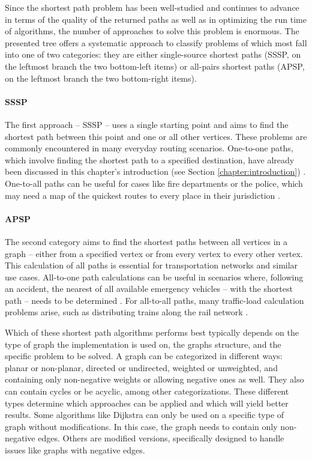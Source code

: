Since the shortest path problem has been well-studied and continues to advance in terms of the quality of the returned paths as well as in optimizing the run time of algorithms, the number of approaches to solve this problem is enormous.
The presented tree offers a systematic approach to classify problems of which most fall into one of two categories: they are either single-source shortest paths (SSSP, on the leftmost branch the two bottom-left items) or all-pairs shortest paths (APSP, on the leftmost branch the two bottom-right items).

\paragraph{SSSP}

The first approach -- SSSP -- uses a single starting point and aims to find the shortest path between this point and one or all other vertices.
These problems are commonly encountered in many everyday routing scenarios. 
One-to-one paths, which involve finding the shortest path to a specified destination, have already been discussed in this chapter's introduction (see Section \ref{chapter:introduction}) \cite{sanders_shortest_2019}.
One-to-all paths can be useful for cases like fire departments or the police, which may need a map of the quickest routes to every place in their jurisdiction \cite{sanders_shortest_2019}.

\paragraph{APSP}

The second category aims to find the shortest paths between all vertices in a graph -- either from a specified vertex or from every vertex to every other vertex. 
This calculation of all paths is essential for transportation networks and similar use cases. 
All-to-one path calculations can be useful in scenarios where, following an accident, the nearest of all available emergency vehicles -- with the shortest path -- needs to be determined \cite{khamayseh_efficient_2015}.
For all-to-all paths, many traffic-load calculation problems arise, such as distributing trains along the rail network \cite{curtis_rewire_2012}.


Which of these shortest path algorithms performs best typically depends on the type of graph the implementation is used on, the graphs structure, and the specific problem to be solved. 
A graph can be categorized in different ways: planar or non-planar, directed or undirected, weighted or unweighted, and containing only non-negative weights or allowing negative ones as well.
They also can contain cycles or be acyclic, among other categorizations. 
These different types determine which approaches can be applied and which will yield better results.
Some algorithms like Dijkstra can only be used on a specific type of graph without modifications. 
In this case, the graph needs to contain only non-negative edges.
Others are modified versions, specifically designed to handle issues like graphs with negative edges. 


